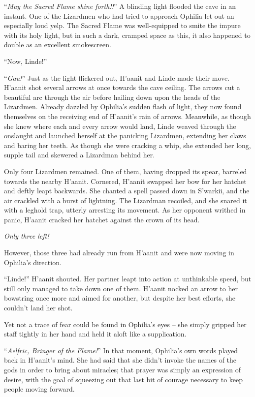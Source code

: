 ``\emph{May the Sacred Flame shine forth!!}'' A blinding light flooded the cave in an instant. One of the Lizardmen who had tried to approach Ophilia let out an especially loud yelp. The Sacred Flame was well-equipped to smite the impure with its holy light, but in such a dark, cramped space as this, it also happened to double as an excellent smokescreen.

``Now, Linde!''

``\emph{Gau!}'' Just as the light flickered out, H'aanit and Linde made their move. H'aanit shot several arrows at once towards the cave ceiling. The arrows cut a beautiful arc through the air before hailing down upon the heads of the Lizardmen. Already dazzled by Ophilia's sudden flash of light, they now found themselves on the receiving end of H'aanit's rain of arrows. Meanwhile, as though she knew where each and every arrow would land, Linde weaved through the onslaught and launched herself at the panicking Lizardmen, extending her claws and baring her teeth. As though she were cracking a whip, she extended her long, supple tail and skewered a Lizardman behind her.

Only four Lizardmen remained. One of them, having dropped its spear, barreled towards the nearby H'aanit. Cornered, H'aanit swapped her bow for her hatchet and deftly leapt backwards. She chanted a spell passed down in S'warkii, and the air crackled with a burst of lightning. The Lizardman recoiled, and she snared it with a leghold trap, utterly arresting its movement. As her opponent writhed in panic, H'aanit cracked her hatchet against the crown of its head.

\emph{Only three left!}

However, those three had already run from H'aanit and were now moving in Ophilia's direction.

``Linde!'' H'aanit shouted. Her partner leapt into action at unthinkable speed, but still only managed to take down one of them. H'aanit nocked an arrow to her bowstring once more and aimed for another, but despite her best efforts, she couldn't land her shot.

Yet not a trace of fear could be found in Ophilia's eyes -- she simply gripped her staff tightly in her hand and held it aloft like a supplication. 

``\emph{Aelfric, Bringer of the Flame!}'' In that moment, Ophilia's own words played back in H'aanit's mind. She had said that she didn't invoke the names of the gods in order to bring about miracles; that prayer was simply an expression of desire, with the goal of squeezing out that last bit of courage necessary to keep people moving forward.

